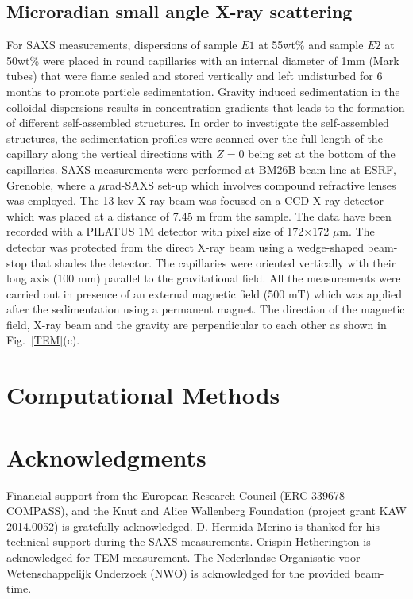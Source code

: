 \documentclass[aps,prl,preprint,superscriptaddress]{revtex4-1}
\begin{document}
\subsection{Microradian small angle X-ray scattering}
For SAXS measurements, dispersions of sample $E1$ at 55wt\% and sample $E2$ at 50wt\% were placed in round capillaries with an internal diameter of 1mm (Mark tubes) that were flame sealed and stored vertically and left undisturbed for 6 months to promote particle sedimentation. Gravity induced sedimentation in the colloidal dispersions results in concentration gradients that leads to the formation of different self-assembled structures. In order to investigate the self-assembled structures, the sedimentation profiles were scanned over the full length of the capillary along the vertical directions with $Z=0$ being set at the bottom of the capillaries. SAXS measurements were performed at BM26B beam-line at ESRF, Grenoble, where a $\mu$rad-SAXS set-up which involves compound refractive lenses~\cite{petukhov2015particle} was employed. The 13 kev X-ray beam was focused on a CCD X-ray detector which was placed at a distance of 7.45 m from the sample. The data have been recorded with a PILATUS 1M detector with pixel size of 172$\times$172 $\mu$m. The detector was protected from the direct X-ray beam using a wedge-shaped beam-stop that shades the detector. The capillaries were oriented vertically with their long axis (100 mm) parallel to the gravitational field. All the measurements were carried out in presence of an external magnetic field (500 mT) which was applied after the sedimentation using a permanent magnet. The direction of the magnetic field, X-ray beam and the gravity are perpendicular to each other as shown in Fig.~\ref{TEM}(c).
\section{Computational Methods}

\section{Acknowledgments}
Financial support from the European Research Council (ERC-339678-COMPASS), and the Knut and Alice Wallenberg Foundation (project grant KAW 2014.0052) is gratefully acknowledged. D. Hermida Merino is thanked for his technical support during the SAXS measurements. Crispin Hetherington is acknowledged for TEM measurement. The Nederlandse Organisatie voor Wetenschappelijk Onderzoek (NWO) is acknowledged for the provided beam-time.
\end{document}
